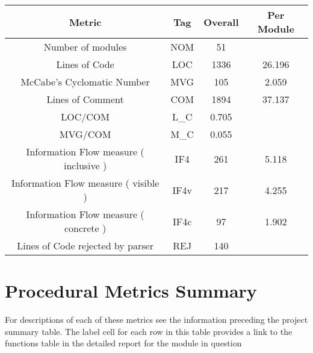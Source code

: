 \begin{tabular}{|c|c|c|c|}
\hline 
Metric &Tag &Overall &Per Module \\
 \hline 
Number of modules &NOM & 51 &  \\
 \hline 
Lines of Code &LOC & 1336 &26.196 \\
 \hline 
McCabe's Cyclomatic Number &MVG & 105 & 2.059 \\
 \hline 
Lines of Comment &COM & 1894 &37.137 \\
 \hline 
LOC/COM &L\_C & 0.705 &  \\
 \hline 
MVG/COM &M\_C & 0.055 &  \\
 \hline 
Information Flow measure (  inclusive ) &IF4 & 261 & 5.118 \\
 \hline 
Information Flow measure (  visible ) &IF4v & 217 & 4.255 \\
 \hline 
Information Flow measure (  concrete ) &IF4c & 97 & 1.902 \\
 \hline 
Lines of Code rejected by parser &REJ & 140 &  \\
 \hline 

\end{tabular}

\section{Procedural Metrics Summary}
 For descriptions of each of these metrics see the information preceding the project summary table. The label cell for each row in this
table provides a link to the functions table in the detailed report for the module in question 

